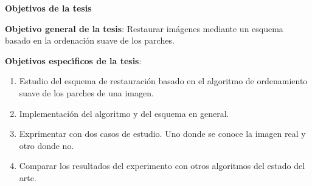 \begin{abstract}
	[Redactar el abstract]  
\end{abstract}
\newpage

\begin{center}
	{\large \textbf{Objetivos de la tesis}}
\end{center}
\qquad 

\qquad\textbf{Objetivo general de la tesis}: Restaurar im\'agenes mediante un esquema basado en la ordenaci\'on suave de los parches.

\qquad 

\qquad 

\qquad\textbf{Objetivos espec\'{\i}ficos de la tesis}:
\begin{enumerate}
	\item Estudio del esquema de restauraci\'on basado en el algoritmo de ordenamiento suave de los parches de una imagen.
	\item Implementaci\'on del algoritmo y del esquema en general.
	\item Exprimentar con dos casos de estudio. Uno donde se conoce la imagen real y otro donde no.
	\item Comparar los resultados del experimento con otros algoritmos del estado del arte.
\end{enumerate}